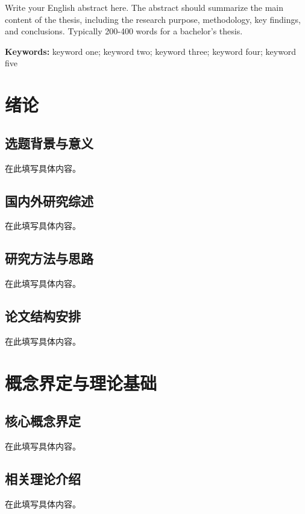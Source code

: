 \documentclass[a4paper,12pt,oneside]{ctexart}
\begin{document}
Write your English abstract here. The abstract should summarize the main content of the thesis, including the research purpose, methodology, key findings, and conclusions. Typically 200-400 words for a bachelor's thesis.

\vspace{1cm}
\noindent\textbf{Keywords:} keyword one; keyword two; keyword three; keyword four; keyword five

\newpage
\tableofcontents


\newpage


\section{绪论}
\subsection{选题背景与意义}
在此填写具体内容。

\subsection{国内外研究综述}
在此填写具体内容。

\subsection{研究方法与思路}
在此填写具体内容。

\subsection{论文结构安排}
在此填写具体内容。


\section{概念界定与理论基础}
\subsection{核心概念界定}
在此填写具体内容。

\subsection{相关理论介绍}
在此填写具体内容。
\end{document}
